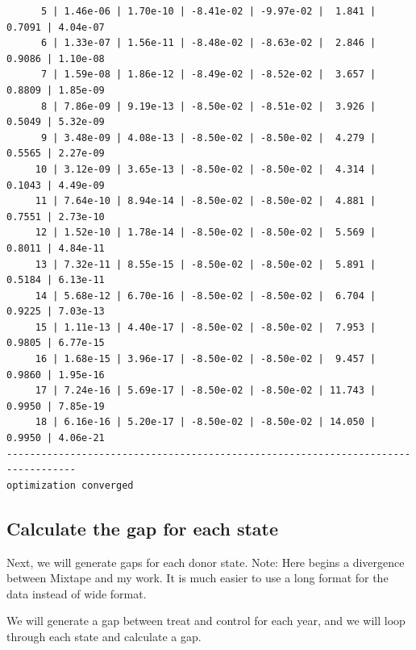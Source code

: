 \documentclass[
]{book}
\begin{document}
\begin{verbatim}
      5 | 1.46e-06 | 1.70e-10 | -8.41e-02 | -9.97e-02 |  1.841 | 0.7091 | 4.04e-07
      6 | 1.33e-07 | 1.56e-11 | -8.48e-02 | -8.63e-02 |  2.846 | 0.9086 | 1.10e-08
      7 | 1.59e-08 | 1.86e-12 | -8.49e-02 | -8.52e-02 |  3.657 | 0.8809 | 1.85e-09
      8 | 7.86e-09 | 9.19e-13 | -8.50e-02 | -8.51e-02 |  3.926 | 0.5049 | 5.32e-09
      9 | 3.48e-09 | 4.08e-13 | -8.50e-02 | -8.50e-02 |  4.279 | 0.5565 | 2.27e-09
     10 | 3.12e-09 | 3.65e-13 | -8.50e-02 | -8.50e-02 |  4.314 | 0.1043 | 4.49e-09
     11 | 7.64e-10 | 8.94e-14 | -8.50e-02 | -8.50e-02 |  4.881 | 0.7551 | 2.73e-10
     12 | 1.52e-10 | 1.78e-14 | -8.50e-02 | -8.50e-02 |  5.569 | 0.8011 | 4.84e-11
     13 | 7.32e-11 | 8.55e-15 | -8.50e-02 | -8.50e-02 |  5.891 | 0.5184 | 6.13e-11
     14 | 5.68e-12 | 6.70e-16 | -8.50e-02 | -8.50e-02 |  6.704 | 0.9225 | 7.03e-13
     15 | 1.11e-13 | 4.40e-17 | -8.50e-02 | -8.50e-02 |  7.953 | 0.9805 | 6.77e-15
     16 | 1.68e-15 | 3.96e-17 | -8.50e-02 | -8.50e-02 |  9.457 | 0.9860 | 1.95e-16
     17 | 7.24e-16 | 5.69e-17 | -8.50e-02 | -8.50e-02 | 11.743 | 0.9950 | 7.85e-19
     18 | 6.16e-16 | 5.20e-17 | -8.50e-02 | -8.50e-02 | 14.050 | 0.9950 | 4.06e-21
----------------------------------------------------------------------------------
optimization converged
\end{verbatim}

\subsection{Calculate the gap for each state}\label{calculate-the-gap-for-each-state}

Next, we will generate gaps for each donor state. Note: Here begins a divergence between Mixtape and my work. It is much easier to use a long format for the data instead of wide format.

We will generate a gap between treat and control for each year, and we will loop through each state and calculate a gap.
\end{document}
